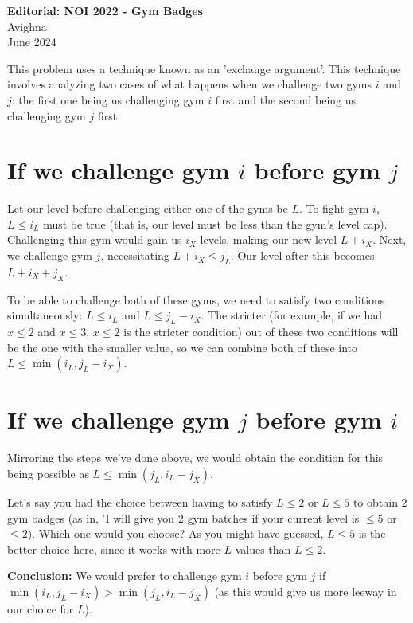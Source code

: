 \documentclass{article}
\begin{document}
\begin{center}
  \large{\textbf{Editorial: NOI 2022 - Gym Badges}}\\
  \vspace{0.2em}
  \large{Avighna}\\
  \vspace{0.2em}
  \large{June 2024}
\end{center}

This problem uses a technique known as an 'exchange argument'. This technique involves analyzing two cases of what happens when we challenge two gyms $i$ and $j$: the first one being us challenging gym $i$ first and the second being us challenging gym $j$ first.

\section*{If we challenge gym $i$ before gym $j$}
Let our level before challenging either one of the gyms be $L$. To fight gym $i$, $L \le i_L$ must be true (that is, our level must be less than the gym's level cap). Challenging this gym would gain us $i_X$ levels, making our new level $L+i_X$. Next, we challenge gym $j$, necessitating $L + i_X \le j_L$. Our level after this becomes $L+i_X+j_X$.

To be able to challenge both of these gyms, we need to satisfy two conditions simultaneously: $L \le i_L$ and $L \le j_L-i_X$. The stricter (for example, if we had $x \le 2$ and $x \le 3$, $x \le 2$ is the stricter condition) out of these two conditions will be the one with the smaller value, so we can combine both of these into $L \le \min(i_L,j_L-i_X)$.

\section*{If we challenge gym $j$ before gym $i$}
Mirroring the steps we've done above, we would obtain the condition for this being possible as $L \le \min(j_L,i_L-j_X)$.

Let's say you had the choice between having to satisfy $L \le 2$ or $L \le 5$ to obtain $2$ gym badges (as in, 'I will give you $2$ gym batches if your current level is $\le 5$ or $\le 2$). Which one would you choose? As you might have guessed, $L \le 5$ is the better choice here, since it works with more $L$ values than $L\le2$.

\textbf{Conclusion:} We would prefer to challenge gym $i$ before gym $j$ if $\min(i_L,j_L-i_X) > \min(j_L,i_L-j_X)$ (as this would give us more leeway in our choice for $L$).
\end{document}

